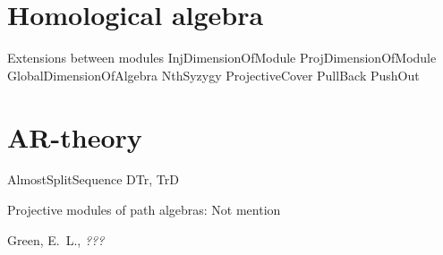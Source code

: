 \documentclass{amsart}
\theoremstyle{definition}
\theoremstyle{theoretic}
\begin{document}
\section{Homological algebra}
Extensions between modules
InjDimensionOfModule
ProjDimensionOfModule
GlobalDimensionOfAlgebra
NthSyzygy
ProjectiveCover
PullBack
PushOut

\section{AR-theory}
AlmostSplitSequence
DTr, TrD

Projective modules of path algebras:
Not mention


\begin{thebibliography}{99}
 Green, E.\ L., \emph{???}
\end{thebibliography}
\end{document}
